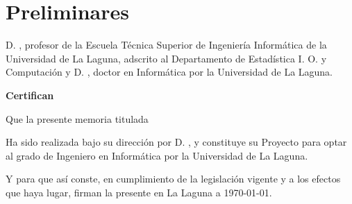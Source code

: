\chapter*{Preliminares}
D. \directorthesis, profesor de la Escuela Técnica Superior de Ingeniería Informática de la Universidad de La Laguna,
adscrito al Departamento de Estadística I. O. y Computación y D. \codirectorthesis, doctor  
en Informática por la Universidad de La Laguna.
\vspace*{0.5cm}

{\bf Certifican} 
\vspace*{0.5cm}

Que la presente memoria titulada

\textit{\titlethesis}

Ha sido realizada bajo su dirección por D. \lucas, y constituye
su Proyecto para optar al grado de Ingeniero en Informática por la Universidad
de La Laguna.

Y para que así conste, en cumplimiento de la legislación vigente y a los efectos
que haya lugar, firman la presente en La Laguna a \today. 

\vspace*{4cm}
\directorthesis 
\hspace*{3cm}
\codirectorthesis 

